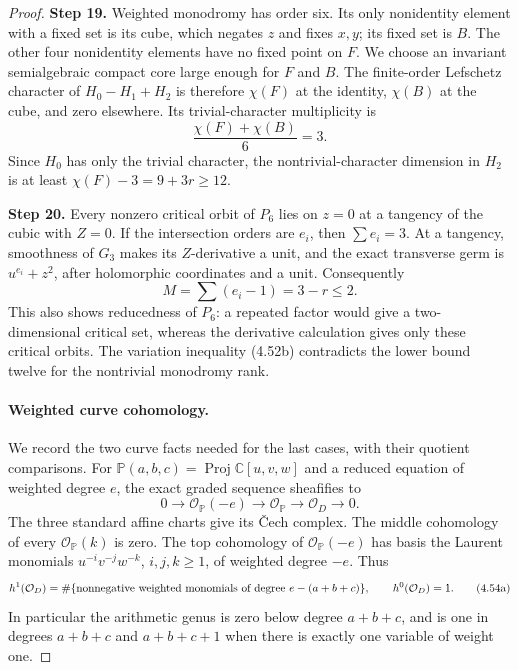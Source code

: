 \begin{proof}
\noindent\textbf{Step 19.} Weighted monodromy has order six. Its only
nonidentity element with a fixed set is its cube,
which negates $z$ and fixes $x,y$; its fixed set is
$B$. The other four nonidentity elements have no
fixed point on $F$. We choose an invariant
semialgebraic compact core large enough for $F$
and $B$. The finite-order Lefschetz character of
$H_0-H_1+H_2$ is therefore $\chi(F)$ at the identity,
$\chi(B)$ at the cube, and zero elsewhere. Its
trivial-character multiplicity is
\[
                       \frac{\chi(F)+\chi(B)}6=3.
\]
Since $H_0$ has only the trivial character, the
nontrivial-character dimension in $H_2$ is at least
$\chi(F)-3=9+3r\ge12$.

\noindent\textbf{Step 20.} Every nonzero critical orbit of $P_6$ lies on $z=0$
at a tangency of the cubic with $Z=0$. If the
intersection orders are $e_i$, then $\sum e_i=3$.
At a tangency, smoothness of $G_3$ makes its
$Z$-derivative a unit, and the exact transverse
germ is $u^{e_i}+z^2$, after holomorphic coordinates
and a unit. Consequently
\[
                       M=\sum(e_i-1)=3-r\le2.
\]
This also shows reducedness of $P_6$: a repeated
factor would give a two-dimensional critical set,
whereas the derivative calculation gives only
these critical orbits. The variation inequality
(4.52b) contradicts the lower bound twelve for
the nontrivial monodromy rank.

\paragraph{Weighted curve cohomology.}
We record the two curve facts needed for the last
cases, with their quotient comparisons. For
$\mathbb P(a,b,c)=\operatorname{Proj}\mathbb C[u,v,w]$
and a reduced equation of weighted degree $e$,
the exact graded sequence sheafifies to
\[
 0\longrightarrow\mathcal O_{\mathbb P}(-e)
 \longrightarrow\mathcal O_{\mathbb P}
 \longrightarrow\mathcal O_D\longrightarrow0.
\]
The three standard affine charts give its \v Cech
complex. The middle cohomology of every
$\mathcal O_{\mathbb P}(k)$ is zero. The top
cohomology of $\mathcal O_{\mathbb P}(-e)$ has
basis the Laurent monomials $u^{-i}v^{-j}w^{-k}$,
$i,j,k\ge1$, of weighted degree $-e$. Thus
\[
 h^1(\mathcal O_D)=
 \#\{\hbox{nonnegative weighted monomials of degree }
                         e-(a+b+c)\},
 \qquad h^0(\mathcal O_D)=1.                         \tag{4.54a}
\]
In particular the arithmetic genus is zero below
degree $a+b+c$, and is one in degrees $a+b+c$
and $a+b+c+1$ when there is exactly one variable
of weight one.


\end{proof}
